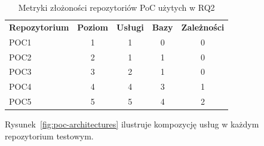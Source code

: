 \begin{table}[h]
    \centering
    \begin{tabular}{lcccc}
        \textbf{Repozytorium} & \textbf{Poziom} & \textbf{Usługi} & \textbf{Bazy} & \textbf{Zależności} \\
        POC1 & 1 & 1 & 0 & 0 \\
        POC2 & 2 & 1 & 1 & 0 \\
        POC3 & 3 & 2 & 1 & 0 \\
        POC4 & 4 & 4 & 3 & 1 \\
        POC5 & 5 & 5 & 4 & 2 \\
    \end{tabular}
    \caption{Metryki złożoności repozytoriów PoC użytych w RQ2}
    \label{tab:h2-complexity}
\end{table}

Rysunek~\ref{fig:poc-architectures} ilustruje kompozycję usług w każdym repozytorium testowym.

